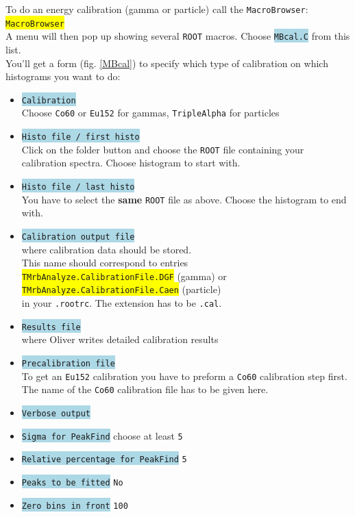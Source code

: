 \documentclass[10pt]{article}
\newcommand{\blue}[1]{\colorbox{lightblue}{\texttt{#1}}}
\newcommand{\yellow}[1]{\colorbox{yellow}{\texttt{#1}}}
\begin{document}
To do an energy calibration (gamma or particle) call the \texttt{MacroBrowser}:\\

\hspace*{.2\linewidth}\yellow{MacroBrowser}\\

A menu will then pop up showing several \texttt{ROOT} macros. Choose \blue{MBcal.C} from this list.\\

You'll get a form (fig. \ref{MBcal}) to specify which type of calibration on which histograms you want to do:
\begin{center}
\begin{itemize}
\setlength{\rightmargin}{1em}%
\setlength{\leftmargin}{2em}%
\setlength{\itemsep}{0pt}%
\setlength{\parskip}{1mm}%
\setlength{\partopsep}{0pt}%
\setlength{\parsep}{0pt}%
\setlength{\topsep}{0pt}%
\item	\blue{Calibration}\\
	Choose \texttt{Co60} or \texttt{Eu152} for gammas, \texttt{TripleAlpha} for particles
\item	\blue{Histo file / first histo}\\
	Click on the folder button and choose the \texttt{ROOT} file containing your calibration spectra.
	Choose histogram to start with.
\item	\blue{Histo file / last histo}\\
	You have to select the \textbf{same} \texttt{ROOT} file as above. Choose the histogram to end with.
\item	\blue{Calibration output file}\\
	where calibration data should be stored.\\
	This name should correspond to entries\\
	\hspace*{3cm}\yellow{TMrbAnalyze.CalibrationFile.DGF} (gamma) or\\
	\hspace*{3cm}\yellow{TMrbAnalyze.CalibrationFile.Caen} (particle)\\
	in your \texttt{.rootrc}.
	The extension has to be \texttt{.cal}.
\item	\blue{Results file}\\
	where Oliver writes detailed calibration results
\item	\blue{Precalibration file}\\
	To get an \texttt{Eu152} calibration you have to preform a \texttt{Co60} calibration step first.
	The name of the \texttt{Co60} calibration file has to be given here.
\item	\blue{Verbose output}
\item	\blue{Sigma for PeakFind} choose at least \texttt{5}
\item	\blue{Relative percentage for PeakFind} \texttt{5}
\item	\blue{Peaks to be fitted} \texttt{No}
\item	\blue{Zero bins in front} \texttt{100}
\end{itemize}
\end{center}
\end{document}
